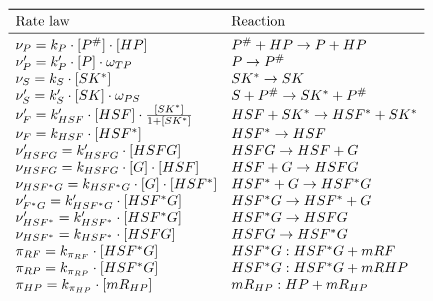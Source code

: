\documentclass[oneside, 10pt, a4paper, twocolumn]{article}
\begin{document}
\clearpage

\bgroup
\def\arraystretch{1.5}%
\begin{table}[h!]
\[\begin{array}{ll}
\toprule
 \text{Rate law}                                                              & \text{Reaction}                 \\
\midrule
 \nu_P        = k_{P} \cdot [P^\#] \cdot [HP]                                 & P^\# + HP \rightarrow P + HP    \\
 \nu_P'       = k_{P}' \cdot [P] \cdot \omega_{TP}                            & P \rightarrow P^\#              \\
 \nu_S        = k_S \cdot [SK^*]                                              & SK^* \rightarrow SK             \\
 \nu_S'       = k_{S}' \cdot [SK] \cdot \omega_{PS}                            & S+P^\# \rightarrow SK^*+P^\#    \\
 \nu_F'       = k_{HSF}' \cdot [HSF] \cdot \frac{[SK^*]}{1+[SK^*]}            & HSF+SK^* \rightarrow HSF^*+SK^* \\
 \nu_F        = k_{HSF} \cdot [HSF^*]                                         & HSF^* \rightarrow HSF           \\    
 \nu_{HSFG}'  = k_{HSFG}' \cdot [HSFG]                                        & HSFG \rightarrow HSF + G        \\
 \nu_{HSFG}   = k_{HSFG} \cdot [G] \cdot [HSF]                                & HSF + G \rightarrow HSFG        \\ 
 \nu_{HSF^*G} = k_{HSF^*G} \cdot [G] \cdot [HSF^*]                            & HSF^* + G \rightarrow HSF^*G    \\ 
 \nu_{F^*G}'  = k_{HSF^*G}' \cdot [HSF^*G]                                    & HSF^*G \rightarrow HSF^* + G    \\
 \nu_{HSF^*}' = k_{HSF^*}' \cdot [HSF^*G]                                     & HSF^*G \rightarrow HSFG         \\
 \nu_{HSF^*}  = k_{HSF^*} \cdot [HSFG]                                        & HSFG \rightarrow HSF^*G         \\
 \pi_{RF}     = k_{\pi_{RF}} \cdot [HSF^*G]                                   & HSF^*G: HSF^*G + mRF            \\
 \pi_{RP}     = k_{\pi_{RP}} \cdot [HSF^*G]                                   & HSF^*G: HSF^*G + mRHP           \\
 \pi_{HP}     = k_{\pi_{HP}} \cdot [mR_{HP}]                                  & mR_{HP}: HP + mR_{HP}           \\

\end{array}\]
\end{table}
\end{document}
